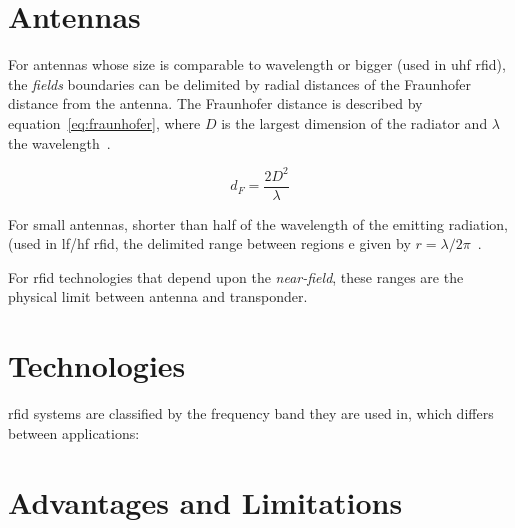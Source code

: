 




\section{Antennas}

For antennas whose size is comparable to wavelength or bigger (used in \ac{uhf} \ac{rfid}), the \emph{fields} boundaries can be delimited by radial distances of the Fraunhofer distance from the antenna. The Fraunhofer distance is described by equation~\ref{eq:fraunhofer}, where $D$ is the largest dimension of the radiator and $\lambda$ the wavelength~\cite{balanisAntennaTheoryAnalysis2005}.

\begin{equation} \label{eq:fraunhofer}
    d_F = \frac{2D^2}{\lambda}
\end{equation}

For small antennas, shorter than half of the wavelength of the emitting radiation, (used in \ac{lf}/\ac{hf} \ac{rfid}, the delimited range between regions e given by $r = \lambda / 2\pi$~\cite{nikitinOverviewFieldUHF2007a}.

For \ac{rfid} technologies that depend upon the \emph{near-field}, these ranges are the physical limit between antenna and transponder.

\section{Technologies}

\ac{rfid} systems are classified by the frequency band they are used in, which differs between applications:

\section{Advantages and Limitations}

